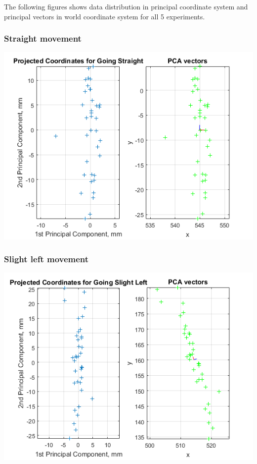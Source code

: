 \documentclass[a4paper, 12pt]{article}
\begin{document}
\medskip

The following figures shows data distribution in principal coordinate system and principal vectors in world coordinate system for all 5 experiments.


\subsubsection{Straight movement}

\begin{center}
  \includegraphics[scale=0.8]{s1}
\end{center}



\subsubsection{Slight left movement}

\begin{center}
  \includegraphics[scale=0.8]{l1}
\end{center}
\end{document}
